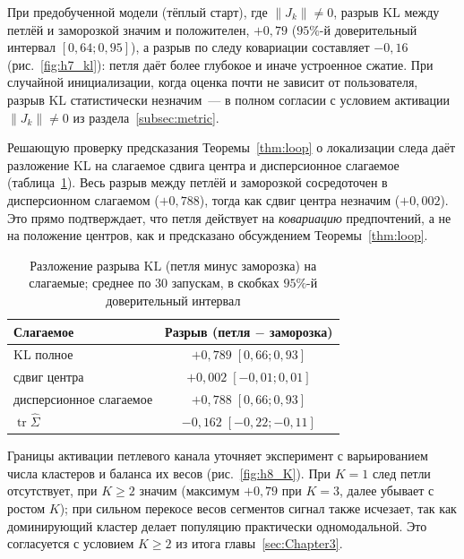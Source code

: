 При предобученной модели (тёплый старт), где $\lVert J_k\rVert\neq0$, разрыв
$\mathrm{KL}$ между петлёй и заморозкой значим и положителен, $+0{,}79$
($95\%$-й доверительный интервал $[0{,}64;0{,}95]$), а разрыв по следу ковариации
составляет $-0{,}16$ (рис.~\ref{fig:h7_kl}): петля даёт более глубокое и иначе
устроенное сжатие. При случайной инициализации, когда оценка почти не зависит от
пользователя, разрыв $\mathrm{KL}$ статистически незначим~--- в полном
согласии с условием активации $\lVert J_k\rVert\neq0$ из
раздела~\ref{subsec:metric}.

Решающую проверку предсказания Теоремы~\ref{thm:loop} о локализации следа даёт
разложение $\mathrm{KL}$ на слагаемое сдвига центра и дисперсионное слагаемое
(таблица~\ref{tab:dispersion}). Весь разрыв между петлёй и заморозкой
сосредоточен в дисперсионном слагаемом ($+0{,}788$), тогда как сдвиг центра
незначим ($+0{,}002$). Это прямо подтверждает, что петля действует на
\emph{ковариацию} предпочтений, а не на положение центров, как и предсказано
обсуждением Теоремы~\ref{thm:loop}.

\begin{table}[H]
    \caption{Разложение разрыва $\mathrm{KL}$ (петля минус заморозка) на слагаемые;
    среднее по $30$ запускам, в скобках $95\%$-й доверительный интервал}
    \label{tab:dispersion}
    \centering
    \begin{tabular}{lc}
        \toprule
        Слагаемое & Разрыв (петля $-$ заморозка) \\
        \midrule
        $\mathrm{KL}$ полное            & $+0{,}789\;[0{,}66;0{,}93]$ \\
        \quad сдвиг центра              & $+0{,}002\;[-0{,}01;0{,}01]$ \\
        \quad дисперсионное слагаемое   & $+0{,}788\;[0{,}66;0{,}93]$ \\
        $\operatorname{tr}\hat\Sigma$   & $-0{,}162\;[-0{,}22;-0{,}11]$ \\
        \bottomrule
    \end{tabular}
\end{table}

Границы активации петлевого канала уточняет эксперимент с варьированием числа
кластеров и баланса их весов (рис.~\ref{fig:h8_K}). При $K=1$ след петли
отсутствует, при $K\ge2$ значим (максимум $+0{,}79$ при $K=3$, далее убывает с
ростом $K$); при сильном перекосе весов сегментов сигнал также исчезает, так как
доминирующий кластер делает популяцию практически одномодальной. Это согласуется
с условием $K\ge2$ из итога главы~\ref{sec:Chapter3}.

